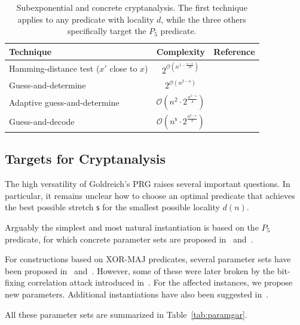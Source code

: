 \documentclass[journal=tosc,submission]{iacrtrans}
\theoremstyle{theorem}
\newcommand\gc[1]{\textcolor{olive!80}{\textbf{Geoffroy:} #1}}
\begin{document}
\begin{table}[!ht]
\centering
\begin{tabular}{@{}lcl@{}}
\toprule
Technique & Complexity & Reference \\
\midrule
Hamming-distance test ($x'$ close to $x$) & $2^{\mathcal{O}(n^{1 - \frac{\mathsf{s} - 1}{2d}})}$ & \cite{EPRINT:Applebaum15,DBLP:conf/approx/BogdanovQ09} \\
Guess-and-determine & $2^{\mathcal{O}(n^{2 - \mathsf{s}})}$ & \cite{AC:CDMRR18} \\
Adaptive guess-and-determine & $\mathcal{O}(n^2 \cdot 2^{\frac{n^{2 - \mathsf{s}}}{4}})$ & \cite{DBLP:journals/tit/YangGJL22} \\
Guess-and-decode & $\mathcal{O}(n^{\mathsf{s}} \cdot 2^{\frac{n^{2 - \mathsf{s}}}{4}})$ & \cite{DBLP:journals/tit/YangGJL22} \\
\bottomrule
\end{tabular}
\caption{\label{tab:subexpattacks}Subexponential and concrete cryptanalysis. The first technique applies to any predicate with locality $d$, while the three others specifically target the $P_5$ predicate.}
\end{table}



\subsection{Targets for Cryptanalysis}
The high versatility of Goldreich's PRG raises several important questions. In particular, it remains unclear how to choose an optimal predicate that achieves the best possible stretch $\mathsf{s}$ for the smallest possible locality $d(n)$.

Arguably the simplest and most natural instantiation is based on the $P_5$ predicate, for which concrete parameter sets are proposed in~\cite{DBLP:journals/tit/YangGJL22} and~\cite{DBLP:conf/eurocrypt/AgarwalBBS25}.

For constructions based on \textsf{XOR-MAJ} predicates, several parameter sets have been proposed in~\cite{DBLP:conf/eurocrypt/AgarwalBBS25} and~\cite{EC:BCMPR24}. However, some of these were later broken by the bit-fixing correlation attack introduced in~\cite{EPRINT:FLLL24}. For the affected instances, we propose new parameters. Additional instantiations have also been suggested in~\cite{AC:CDDKS24}.

All these parameter sets are summarized in Table~\ref{tab:paramgar}.
\end{document}
